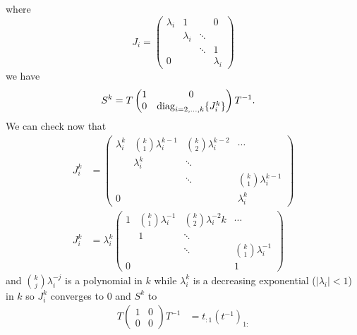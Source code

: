 \begin{solution}
  where
  \[ J_i =
    \begin{pmatrix}
      \lambda_i & 1 &  & 0\\
                & \lambda_i & \ddots &\\
                & & \ddots & 1\\
      0 & & & \lambda_i
    \end{pmatrix}
  \]
  we have
  \begin{align*}
    S^k & =
    T
    \begin{pmatrix}
      1 & 0\\
      0 &
      \operatorname{diag}_{i = 2, \ldots, k}
      \{J_i^k\}
    \end{pmatrix}
    T^{-1}.
  \end{align*}
  We can check now that
  \begin{align*}
    J_i^k & =
    \begin{pmatrix}
      \lambda_i^k & {k \choose 1}\lambda_i^{k-1} & {k \choose 2}\lambda_i^{k-2} & \cdots\\
                  & \lambda_i^k & \ddots & \\
                  & & \ddots & {k \choose 1} \lambda_i^{k-1}\\
      0 & & & \lambda_i^k
    \end{pmatrix}\\
    J_i^k & =
    \lambda_i^k
    \begin{pmatrix}
      1 & {k \choose 1}\lambda_i^{-1} & {k \choose 2}\lambda_i^{-2}k & \cdots\\
          & 1 & \ddots & \\
          & & \ddots & {k \choose 1}\lambda_i^{-1}\\
      0 & & & 1
    \end{pmatrix}
  \end{align*}
  and ${k \choose j} \lambda_i^{-j}$ is a polynomial in $k$ while $\lambda_i^k$ is a decreasing exponential ($|\lambda_i| < 1$) in $k$ so
  $J_i^k$ converges to $0$ and $S^k$ to
  \begin{align}
    T
    \begin{pmatrix}
      1 & 0\\
      0 & 0
    \end{pmatrix}
    T^{-1}
    & =
    t_{:1}(t^{-1})_{1:}
  \end{align}


\end{solution}

